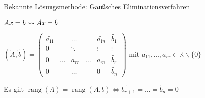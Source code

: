 \documentclass[11pt]{scrartcl}
\DeclareMathOperator*{\rang}{\mathrm{rang}}
\theoremstyle{break}
\theoremstyle{remark}
\begin{document}
Bekannte Lösungsmethode: Gaußsches Eliminationsverfahren

$Ax=b \rightsquigarrow \tilde{A}x = \tilde{b} \\$

\(
(\tilde{A},\tilde{b})=
\begin{pmatrix} 
\tilde{a_{11}} & &\dots  &  & \tilde{a_{1n}} & \tilde{b_1} \\
0 & & \ddots &  & \vdots & \vdots \\
0 & \dots & a_{rr} & \dots & a_{rn} & \tilde{b_r} \\
0 & & \dots & & 0 & \tilde{b_n} \end{pmatrix}
\)
mit $\tilde{a_{11}}, \dots, a_{rr} \in \mathbb{K} \backslash \{0\} $

Es gilt $\rang(A)= \rang(A,b) \Leftrightarrow 
\tilde{b_{r+1}} = \dots = \tilde{b_n} = 0$
\end{document}
